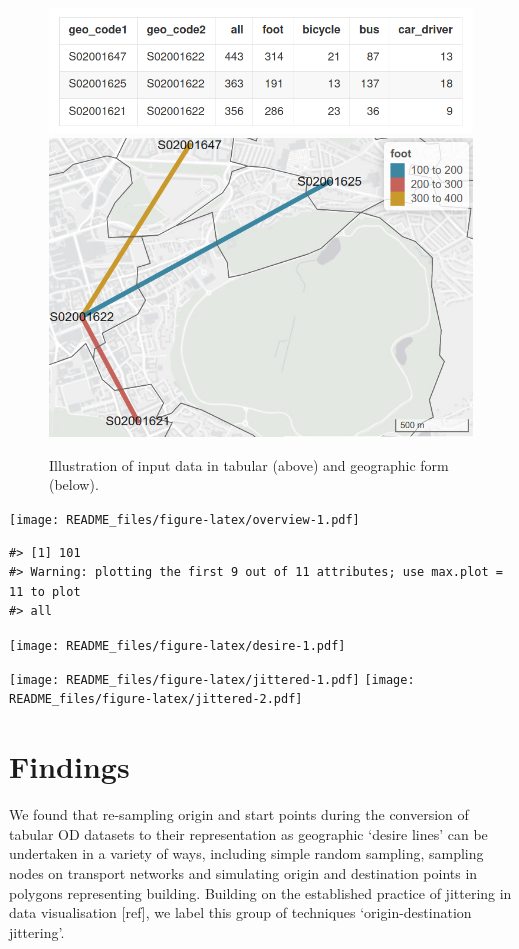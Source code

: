 \documentclass[
]{article}
\begin{document}
\begin{figure}
\includegraphics[width=1\linewidth]{figures/od-top-3-table} \includegraphics[width=1\linewidth]{figures/od-top-3} \caption{Illustration of input data in tabular (above) and geographic form (below).}\label{fig:od}
\end{figure}

\texttt{[image: README\_files/figure-latex/overview-1.pdf]}

\begin{verbatim}
#> [1] 101
#> Warning: plotting the first 9 out of 11 attributes; use max.plot = 11 to plot
#> all
\end{verbatim}

\texttt{[image: README\_files/figure-latex/desire-1.pdf]}

\texttt{[image: README\_files/figure-latex/jittered-1.pdf]} \texttt{[image: README\_files/figure-latex/jittered-2.pdf]}

\hypertarget{findings}{%
\section{Findings}\label{findings}}

We found that re-sampling origin and start points during the conversion of tabular OD datasets to their representation as geographic `desire lines' can be undertaken in a variety of ways, including simple random sampling, sampling nodes on transport networks and simulating origin and destination points in polygons representing building.
Building on the established practice of jittering in data visualisation {[}ref{]}, we label this group of techniques `origin-destination jittering'.
\end{document}

